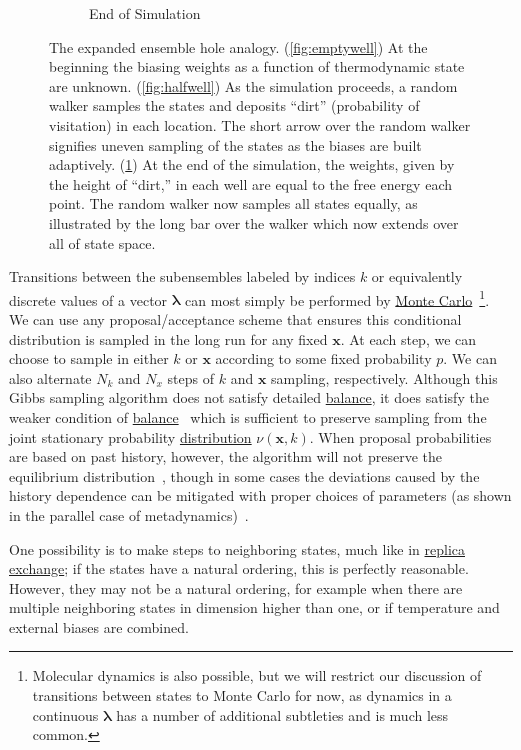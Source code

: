 \documentclass[9pt,review]{livecoms}
\newcommand{\vx}{\mathbf{x}}
\begin{document}
\begin{figure}[ht]
\begin{subfigure}[b]{0.33\textwidth}
\caption{End of Simulation}
\label{fig:fullwell}
\end{subfigure}
\caption{The expanded ensemble hole analogy. (\ref{fig:emptywell}) At the beginning the biasing weights as a function of thermodynamic state are unknown. (\ref{fig:halfwell}) As the simulation proceeds, a random walker samples the states and deposits ``dirt'' (probability of visitation) in each location.  The short arrow over the random walker signifies uneven sampling of the states as the biases are built adaptively.  (\ref{fig:fullwell}) At the end of the simulation, the weights, given by the height of ``dirt,'' in each well are equal to the free energy each point.  The random walker now samples all states equally, as illustrated by the long bar over the walker which now extends over all of state space.} \label{fig:EXEanalogy}
\end{figure}


Transitions between the subensembles labeled by indices $k$ or equivalently discrete values of a vector $\mathbf{\lambda}$ can most simply be performed by \hyperlink{ref:MetropolisMonteCarlo} {Monte Carlo}~\footnote{Molecular dynamics is also possible, but we will restrict our discussion of transitions
between states to Monte Carlo for now, as dynamics in a continuous $\mathbf{\lambda}$ has a number of additional subtleties and is much less common.}.  We can use any proposal/acceptance scheme that ensures this conditional distribution is sampled in the long run for any fixed $\vx$. At each step, we can choose to sample in either $k$ or $\vx$ according to some fixed probability $p$.  We can also alternate $N_k$ and $N_x$ steps of $k$ and $\vx$ sampling, respectively.  Although this Gibbs sampling algorithm does not satisfy detailed \hyperlink{ref:Balance} {balance}, it does satisfy the weaker condition of \hyperlink{ref:Balance} {balance}~\cite{deem:jcp:1999:balance} which is sufficient to preserve sampling from the joint stationary probability \hyperlink{ref:Distribution} {distribution}  $\nu(\vx,k)$.  When proposal probabilities are based on past history, however, the algorithm will not preserve the equilibrium distribution~\cite{reinhardt:cpl:2000:step-size-adjustment}, though in some cases the deviations caused by the history dependence can be mitigated with proper choices of parameters (as shown in the parallel case of metadynamics)~\cite{bussi.equilibriummetadynamics}.

One possibility is to make steps to neighboring states, much like in \hyperlink{ref:ReplEx} {replica exchange}; if the states have a natural ordering, this is perfectly reasonable. However, they may not be a natural ordering, for example when there are multiple neighboring states in dimension higher than one, or if temperature and external biases are combined.
\end{document}
